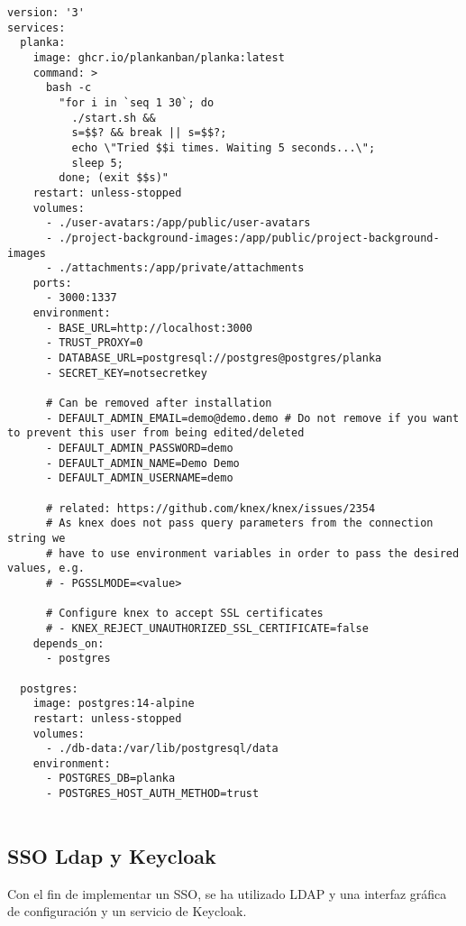 \begin{lstlisting}[style=yaml, caption={docker-compose.yml Planka prueba de concepto.}, label={lst:planka} ]
version: '3'
services:
  planka:
    image: ghcr.io/plankanban/planka:latest
    command: >
      bash -c
        "for i in `seq 1 30`; do
          ./start.sh &&
          s=$$? && break || s=$$?;
          echo \"Tried $$i times. Waiting 5 seconds...\";
          sleep 5;
        done; (exit $$s)"
    restart: unless-stopped
    volumes:
      - ./user-avatars:/app/public/user-avatars
      - ./project-background-images:/app/public/project-background-images
      - ./attachments:/app/private/attachments
    ports:
      - 3000:1337
    environment:
      - BASE_URL=http://localhost:3000
      - TRUST_PROXY=0
      - DATABASE_URL=postgresql://postgres@postgres/planka
      - SECRET_KEY=notsecretkey

      # Can be removed after installation
      - DEFAULT_ADMIN_EMAIL=demo@demo.demo # Do not remove if you want to prevent this user from being edited/deleted
      - DEFAULT_ADMIN_PASSWORD=demo
      - DEFAULT_ADMIN_NAME=Demo Demo
      - DEFAULT_ADMIN_USERNAME=demo

      # related: https://github.com/knex/knex/issues/2354
      # As knex does not pass query parameters from the connection string we
      # have to use environment variables in order to pass the desired values, e.g.
      # - PGSSLMODE=<value>

      # Configure knex to accept SSL certificates
      # - KNEX_REJECT_UNAUTHORIZED_SSL_CERTIFICATE=false
    depends_on:
      - postgres

  postgres:
    image: postgres:14-alpine
    restart: unless-stopped
    volumes:
      - ./db-data:/var/lib/postgresql/data
    environment:
      - POSTGRES_DB=planka
      - POSTGRES_HOST_AUTH_METHOD=trust


\end{lstlisting}

\subsection{SSO Ldap y Keycloak}\label{S:sso_example}
Con el fin de implementar un SSO, se ha utilizado LDAP\cite{c_ldap} y una interfaz gráfica de configuración y un servicio de Keycloak\cite{c_keycloak}.

